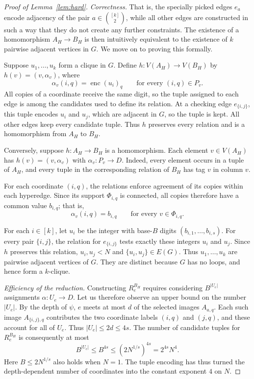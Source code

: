 \documentclass[11pt,letterpaper]{article}
\theoremstyle{definition}
\theoremstyle{remark}
\begin{document}
\begin{proof}[Proof of Lemma~\ref{lem:hard}]
\smallskip\textit{Correctness.}
That is, the specially picked edges $e_a$ encode adjacency of the pair $a\in \binom{[k]}{2}$, while all other edges are constructed in such a way that they do not create any further constraints. The existence of a homomorphism $A_H\to B_H$ is then intuitively equivalent to the existence of $k$ pairwise adjacent vertices in $G$. We move on to proving this formally.


Suppose $u_1,\ldots,u_k$ form a clique in $G$. Define
$h:V(A_H)\to V(B_H)$ by $h(v)=(v,\alpha_v)$, where
\[
 \alpha_v(i,q)=\operatorname{enc}(u_i)_q
 \qquad\text{for every }(i,q)\in P_v.
\]
All copies of a coordinate receive the same digit, so the tuple assigned
to each edge is among the candidates used to define its relation.
At a checking edge $e_{\{i,j\}}$, this tuple encodes $u_i$ and $u_j$,
which are adjacent in $G$, so the tuple is kept. All other edges keep
every candidate tuple. Thus $h$ preserves every relation and is a
homomorphism from $A_H$ to $B_H$.

Conversely, suppose $h:A_H\to B_H$ is a homomorphism. Each element
$v\in V(A_H)$ has $h(v)=(v,\alpha_v)$ with $\alpha_v:P_v\to D$.
Indeed, every element occurs in a tuple of $A_H$, and every tuple in
the corresponding relation of $B_H$ has tag $v$ in column $v$.

For each coordinate $(i,q)$, the relations enforce agreement of its
copies within each hyperedge. Since its support $\Phi_{i,q}$ is connected,
all copies therefore have a common value $b_{i,q}$; that is,
\[
 \alpha_v(i,q)=b_{i,q}\qquad\text{for every }v\in\Phi_{i,q}.
\]

For each $i\in[k]$, let $u_i$ be the integer with base-$B$ digits
$(b_{i,1},\ldots,b_{i,s})$. For every pair $\{i,j\}$, the relation
for $e_{\{i,j\}}$ tests exactly these integers $u_i$ and $u_j$.
Since $h$ preserves this relation, $u_i,u_j<N$ and
$\{u_i,u_j\}\in E(G)$. Thus $u_1,\ldots,u_k$ are pairwise adjacent
vertices of $G$. They are distinct because $G$ has no loops, and hence
form a $k$-clique.

\smallskip
\textit{Efficiency of the reduction.}
Constructing $R_e^{B_H}$ requires considering $B^{|U_e|}$ assignments
$\alpha:U_e\to D$. Let us therefore observe an upper  bound on the number $|U_e|$.
By the depth of $\psi$, $e$ meets at most $d$ of the selected images
$A_{a,q}$. Each such image $A_{\{i,j\},q}$ contributes the two
coordinate labels $(i,q)$ and $(j,q)$, and these account for all of
$U_e$. Thus
\(
 |U_e|\le2d\le4s.
\)
The number of candidate tuples for $R_e^{B_H}$ is consequently at most
\begin{equation}\label{eq:tables}
 B^{|U_e|}\le B^{4s}\le(2N^{1/s})^{4s}=2^{4s}N^4.
\end{equation}
Here $B\le2N^{1/s}$ also holds when $N=1$. The tuple encoding
has thus turned the depth-dependent number of coordinates into the
constant exponent $4$ on $N$.


\end{proof}
\end{document}
